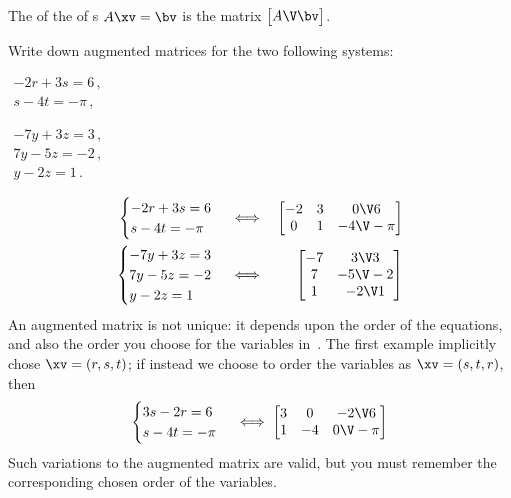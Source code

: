 \begin{definition} \label{def:augmat}
The  of the  of s \(A\xv=\bv\) is the matrix \(\begin{bmatrix} A\V \bv \end{bmatrix}\).
\end{definition}

\begin{example} \label{eg:}
Write down augmented matrices for the two following systems:
\begin{parts}
\item \(\begin{array}{l} -2r+3s=6\,,\\s-4t=-\pi\,, \end{array}\)
\item \(\begin{array}{l}
-7y+3z=3\,,\\7y-5z=-2\,,\\y-2z=1\,.
\end{array}\)
\end{parts}
\begin{solution} 
\begin{eqnarray*}
\begin{cases} -2r+3s=6\\s-4t=-\pi \end{cases}
&\iff&%
\begin{bmatrix} -2&3&0\V6\\ 0&1&-4\V-\pi \end{bmatrix}
\\
\begin{cases}
-7y+3z=3\\7y-5z=-2\\y-2z=1
\end{cases}
&\iff&%
\begin{bmatrix} -7&3\V3\\ 7&-5\V-2\\1&-2\V1 \end{bmatrix}
\end{eqnarray*} 
An augmented matrix is not unique: it depends upon the order of the equations, and also the order you choose for the variables in~\xv.  
The first example implicitly chose \(\xv=(r,s,t)\); if instead we choose to order the variables as \(\xv=(s,t,r)\), then  
\begin{equation*}
\begin{cases} 3s-2r=6\\s-4t=-\pi \end{cases}
\iff%
\begin{bmatrix} 3&0&-2\V6\\ 1&-4&0\V-\pi \end{bmatrix}
\end{equation*} 
Such variations to the augmented matrix are valid, but you must remember the corresponding chosen order of the variables.
\end{solution}
\end{example}


